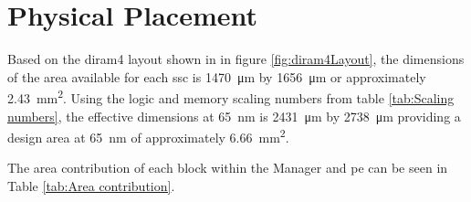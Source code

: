 \section{Physical Placement}
\label{sec:Physical Placement}

Based on the \ac{diram4} layout shown in in figure \ref{fig:diram4Layout}, the dimensions of the area available for each \ac{ssc} is \SI{1470}{\micro\meter} by \SI{1656}{\micro\meter} or approximately \SI{2.43}{\square\milli\meter}.
Using the logic and memory scaling numbers from table \ref{tab:Scaling numbers}, the effective dimensions at \SI{65}{\nano\meter} is \SI{2431}{\micro\meter} by \SI{2738}{\micro\meter} providing a design area at \SI{65}{\nano\meter} of approximately \SI{6.66}{\square\milli\meter}.

The area contribution of each block within the Manager and \ac{pe} can be seen in Table \ref{tab:Area contribution}.
